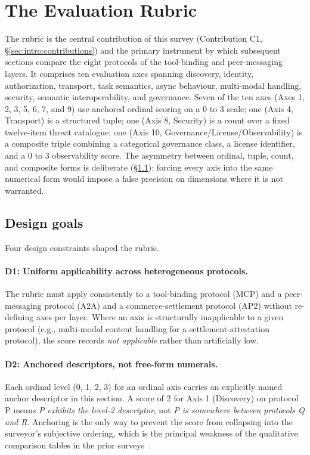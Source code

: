 \section{The Evaluation Rubric}
\label{sec:rubric}

The rubric is the central contribution of this survey
(Contribution C1, \S\ref{sec:intro:contributions}) and the
primary instrument by which subsequent sections compare the
eight protocols of the tool-binding and peer-messaging
layers. It comprises ten evaluation axes spanning
discovery, identity, authorization, transport, task
semantics, async behaviour, multi-modal handling, security,
semantic interoperability, and governance. Seven of the ten
axes (Axes 1, 2, 3, 5, 6, 7, and 9) use anchored ordinal
scoring on a 0 to 3 scale; one (Axis 4, Transport) is a
structured tuple; one (Axis 8, Security) is a count over a
fixed twelve-item threat catalogue; one (Axis 10,
Governance/License/Observability) is a composite triple
combining a categorical governance class, a license
identifier, and a 0 to 3 observability score. The asymmetry
between ordinal, tuple, count, and composite forms is
deliberate (\S\ref{sec:rubric:goals}): forcing every axis
into the same numerical form would impose a false precision
on dimensions where it is not warranted.

\subsection{Design goals}
\label{sec:rubric:goals}

Four design constraints shaped the rubric.

\paragraph{D1: Uniform applicability across heterogeneous
protocols.} The rubric must apply consistently to a
tool-binding protocol (MCP) and a peer-messaging protocol
(A2A) and a commerce-settlement protocol (AP2) without
re-defining axes per layer. Where an axis is structurally
inapplicable to a given protocol (e.g., multi-modal content
handling for a settlement-attestation protocol), the score
records \emph{not applicable} rather than artificially low.

\paragraph{D2: Anchored descriptors, not free-form numerals.}
Each ordinal level (0, 1, 2, 3) for an ordinal axis carries an
explicitly named anchor descriptor in this section. A score
of 2 for Axis 1 (Discovery) on protocol P means \emph{P
exhibits the level-2 descriptor}, not \emph{P is somewhere
between protocols Q and R}. Anchoring is the only way to
prevent the score from collapsing into the surveyor's
subjective ordering, which is the principal weakness of the
qualitative comparison tables in the prior
surveys~\cite{yang2025survey, ehtesham2025interop}.

